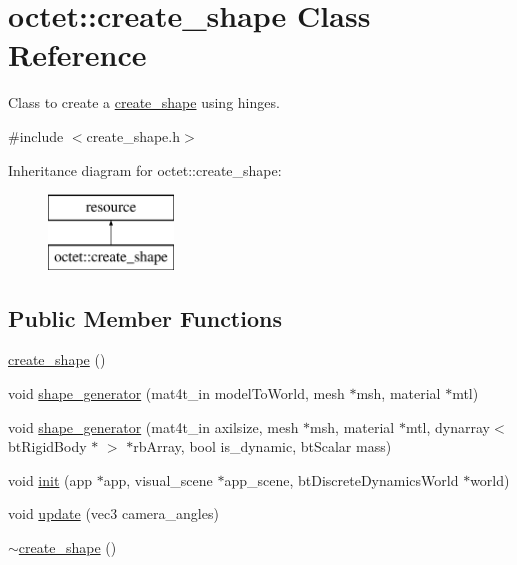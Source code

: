 \hypertarget{classoctet_1_1create__shape}{\section{octet\+:\+:create\+\_\+shape Class Reference}
\label{classoctet_1_1create__shape}
}


Class to create a \hyperlink{classoctet_1_1create__shape}{create\+\_\+shape} using hinges.  




{\ttfamily \#include $<$create\+\_\+shape.\+h$>$}

Inheritance diagram for octet\+:\+:create\+\_\+shape\+:\begin{figure}[H]
\begin{center}
\leavevmode
\includegraphics[height=2.000000cm]{classoctet_1_1create__shape}
\end{center}
\end{figure}
\subsection*{Public Member Functions}
\begin{DoxyCompactItemize}
\item 
\hyperlink{classoctet_1_1create__shape_a2a19e542916cc51135d3d87cd12d3f01}{create\+\_\+shape} ()
\item 
void \hyperlink{classoctet_1_1create__shape_a8abfdf3de2b79f92955c1990000ac85f}{shape\+\_\+generator} (mat4t\+\_\+in model\+To\+World, mesh $\ast$msh, material $\ast$mtl)
\item 
void \hyperlink{classoctet_1_1create__shape_aa79d7fb1e5fc00f78718d016da85c086}{shape\+\_\+generator} (mat4t\+\_\+in axilsize, mesh $\ast$msh, material $\ast$mtl, dynarray$<$ bt\+Rigid\+Body $\ast$ $>$ $\ast$rb\+Array, bool is\+\_\+dynamic, bt\+Scalar mass)
\item 
void \hyperlink{classoctet_1_1create__shape_a2419bbacfee78f9e806dfbf85362d4da}{init} (app $\ast$app, visual\+\_\+scene $\ast$app\+\_\+scene, bt\+Discrete\+Dynamics\+World $\ast$world)
\item 
void \hyperlink{classoctet_1_1create__shape_ac13f881376f9f03db768b8f4cfcee479}{update} (vec3 camera\+\_\+angles)
\item 
\hyperlink{classoctet_1_1create__shape_a49a3ffb8cf1bdfe1601a4cbf5a02f157}{$\sim$create\+\_\+shape} ()
\end{DoxyCompactItemize}


